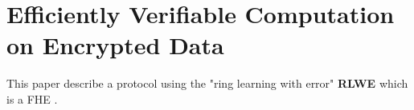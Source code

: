 \section{Efficiently Verifiable Computation on Encrypted Data}

This paper describe a protocol using the "ring learning with error" \textbf{RLWE} which is a FHE \cite{Efficiently_Verifiable_Computation_on_Encrypted_Data}. \\






